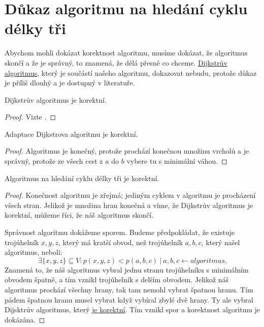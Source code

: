 \section{Důkaz algoritmu na hledání cyklu délky tři}
\label{dukaz_algoritmu}

Abychom mohli dokázat korektnost algoritmu, musíme dokázat, že algoritmus skončí a že je správný, to znamená, že dělá přesně co chceme. \hyperref[sec:dijkstra]{Dijkstrův algoritmus}, který je součástí našeho algoritmu, dokazovat nebudu, protože důkaz je příliš dlouhý a je dostupný v literatuře.
\begin{tvrzeni}
    \label{tvrzeni:dijkstra}
    Dijkstrův algoritmus je korektní.
\end{tvrzeni}
\begin{proof}
    \label{dukaz:dijkstra}
    Vizte \autocite[113]{benlFormalCorrectnessProofs1999}.
\end{proof}
\begin{tvrzeni}
    \label{tvrzeni:dijkstra_adaptace}
    Adaptace Dijkstrova algoritmu je korektní.
\end{tvrzeni}
\begin{proof}
    \label{dukaz:dijkstra_adaptace}
    Algoritmus je konečný, protože prochází konečnou množinu vrcholů a je správný, protože ze všech cest z $a$ do $b$ vybere tu s minimální váhou. 
\end{proof}
\begin{tvrzeni}
    \label{tvrzeni:algoritmus}
    Algoritmus na hledání cyklu délky tři je korektní.
\end{tvrzeni}
\begin{proof}
    \label{dukaz:algoritmus}
Konečnost algoritmu je zřejmá; jediným cyklem v algoritmu je procházení všech stran. Jelikož je množina hran konečná a víme, že Dijkstrův algoritmus je korektní, můžeme říci, že náš algoritmus skončí.

Správnost algoritmu dokážeme sporem. Budeme předpokládat, že existuje trojúhelník $x, y, z$, který má kratší obvod, než trojúhelník $a, b, c$, který našel algoritmus, neboli:
\begin{equation*}
    \exists \{x, y, z\}\subseteq V: p(x, y, z) < p(a, b, c)~|~a, b, c \leftarrow algoritmus.
\end{equation*}
Znamená to, že náš algoritmus vybral jednu stranu trojúhelníku s minimálním obvodem špatně, a tím vznikl trojúhelník s delším obvodem. Jelikož náš algoritmus prochází všechny hrany, tak tam nemohl vybrat špatnou hranu. Tím pádem špatnou hranu musel vybrat když vybíral zbylé dvě hrany. Ty ale vybral Dijsktrův algoritmus, který \hyperref[dukaz:dijkstra]{je korektní}. Tím vznikl spor a korektnost algoritmu je dokázána. 
\end{proof}